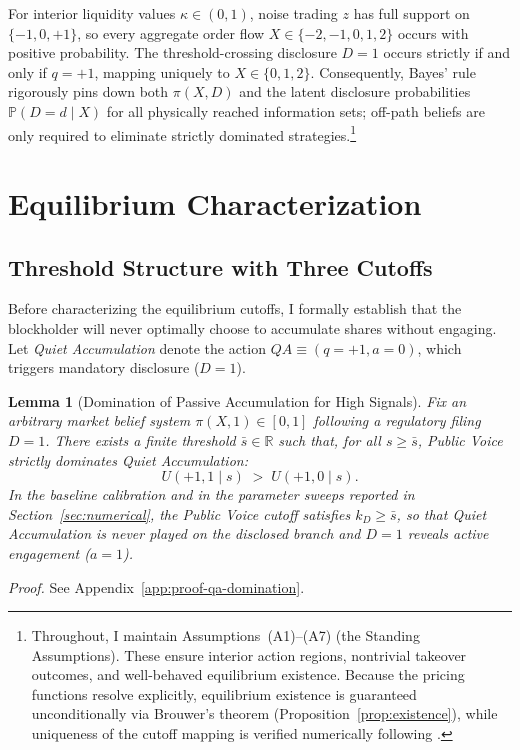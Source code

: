 \documentclass[11pt]{article}
\newtheorem{lemma}{Lemma}
\newcommand{\PP}{\mathbb{P}}
\newcommand{\1}{\mathbf{1}}
\begin{document}
For interior liquidity values $\kappa \in (0,1)$, noise trading $z$ has full support on $\{-1,0,+1\}$, so every aggregate order flow $X \in \{-2,-1,0,1,2\}$ occurs with positive probability. The threshold-crossing disclosure $D=1$ occurs strictly if and only if $q=+1$, mapping uniquely to $X \in \{0,1,2\}$. Consequently, Bayes' rule rigorously pins down both $\pi(X,D)$ and the latent disclosure probabilities $\PP(D=d \mid X)$ for all physically reached information sets; off-path beliefs are only required to eliminate strictly dominated strategies.\footnote{Throughout, I maintain Assumptions~\textup{(A1)}--\textup{(A7)} (the Standing Assumptions). These ensure interior action regions, nontrivial takeover outcomes, and well-behaved equilibrium existence. Because the pricing functions resolve explicitly, equilibrium existence is guaranteed unconditionally via Brouwer's theorem (Proposition~\ref{prop:existence}), while uniqueness of the cutoff mapping is verified numerically following \citet{EdmansGoldsteinJiang2015}.}
\section{Equilibrium Characterization}
\label{sec:equilibrium}

%
\subsection{Threshold Structure with Three Cutoffs}
%

Before characterizing the equilibrium cutoffs, I formally establish that the blockholder will never optimally choose to accumulate shares without engaging. Let \textit{Quiet Accumulation} denote the action $QA \equiv (q=+1, a=0)$, which triggers mandatory disclosure ($D=1$).

\begin{lemma}[Domination of Passive Accumulation for High Signals]
\label{lem:qa-domination}
Fix an arbitrary market belief system $\pi(X,1)\in[0,1]$ following a regulatory filing $D=1$. There exists a finite threshold $\bar{s}\in\mathbb{R}$ such that, for all $s\ge \bar{s}$, Public Voice strictly dominates Quiet Accumulation:
\[
U(+1,1\mid s)\;>\;U(+1,0\mid s).
\]
In the baseline calibration and in the parameter sweeps reported in Section~\ref{sec:numerical}, the Public Voice cutoff satisfies $k_D\ge \bar{s}$, so that Quiet Accumulation is never played on the disclosed branch and $D=1$ reveals active engagement ($a=1$).
\end{lemma}
\textit{Proof.} See Appendix~\ref{app:proof-qa-domination}.
\end{document}
